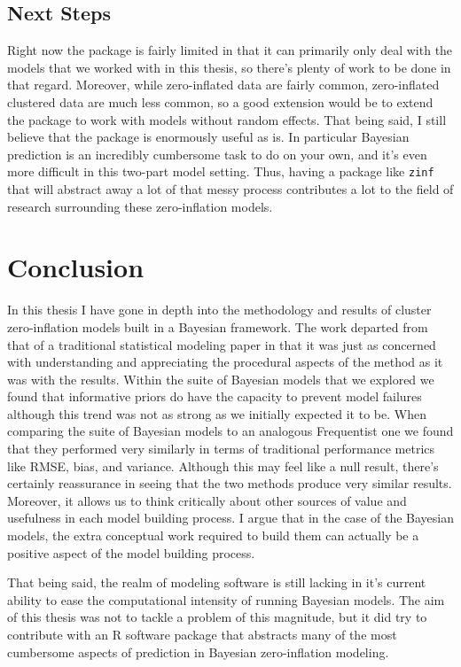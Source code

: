 \documentclass[12pt,twoside]{reedthesis}
\begin{document}
\hypertarget{next-steps}{%
\section{Next Steps}\label{next-steps}}

Right now the package is fairly limited in that it can primarily only deal with the models that we worked with in this thesis, so there's plenty of work to be done in that regard. Moreover, while zero-inflated data are fairly common, zero-inflated clustered data are much less common, so a good extension would be to extend the package to work with models without random effects. That being said, I still believe that the package is enormously useful as is. In particular Bayesian prediction is an incredibly cumbersome task to do on your own, and it's even more difficult in this two-part model setting. Thus, having a package like \texttt{zinf} that will abstract away a lot of that messy process contributes a lot to the field of research surrounding these zero-inflation models.

\hypertarget{conc}{%
\chapter{Conclusion}\label{conc}}

In this thesis I have gone in depth into the methodology and results of cluster zero-inflation models built in a Bayesian framework. The work departed from that of a traditional statistical modeling paper in that it was just as concerned with understanding and appreciating the procedural aspects of the method as it was with the results. Within the suite of Bayesian models that we explored we found that informative priors do have the capacity to prevent model failures although this trend was not as strong as we initially expected it to be. When comparing the suite of Bayesian models to an analogous Frequentist one we found that they performed very similarly in terms of traditional performance metrics like RMSE, bias, and variance. Although this may feel like a null result, there's certainly reassurance in seeing that the two methods produce very similar results. Moreover, it allows us to think critically about other sources of value and usefulness in each model building process. I argue that in the case of the Bayesian models, the extra conceptual work required to build them can actually be a positive aspect of the model building process.

That being said, the realm of modeling software is still lacking in it's current ability to ease the computational intensity of running Bayesian models. The aim of this thesis was not to tackle a problem of this magnitude, but it did try to contribute with an R software package that abstracts many of the most cumbersome aspects of prediction in Bayesian zero-inflation modeling.
\end{document}

